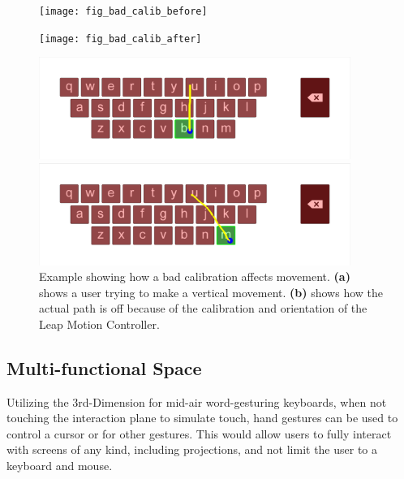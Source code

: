 \begin{figure}[h]
	\centering
	\begin{minipage}[t]{6in}
		\begin{minipage}[t]{1.5in}
			\begin{minipage}[t]{1.5in}
				\texttt{[image: fig\_bad\_calib\_before]}
			\end{minipage}
			
			\begin{minipage}[t]{1.5in}
				\texttt{[image: fig\_bad\_calib\_after]}
			\end{minipage}
		\end{minipage}
		\begin{minipage}[t]{4.5in}
			\begin{minipage}[t]{4.3in}
				\includegraphics[width=4in]{fig_intended_path}
			\end{minipage}
			
			\begin{minipage}[t]{4.3in}
				\includegraphics[width=4in]{fig_actual_path}
			\end{minipage}
		\end{minipage}
	\end{minipage}
	\caption[Bad Calibration Example]{Example showing how a bad calibration affects movement. \textbf{(a)} shows a user trying to make a vertical movement. \textbf{(b)} shows how the actual path is off because of the calibration and orientation of the Leap Motion Controller.}
	\label{bad_calib_problem}
\end{figure}

\subsection{Multi-functional Space}
Utilizing the 3rd-Dimension for mid-air word-gesturing keyboards, when not touching the interaction plane to simulate touch, hand gestures can be used to control a cursor or for other gestures. This would allow users to fully interact with screens of any kind, including projections, and not limit the user to a keyboard and mouse.

